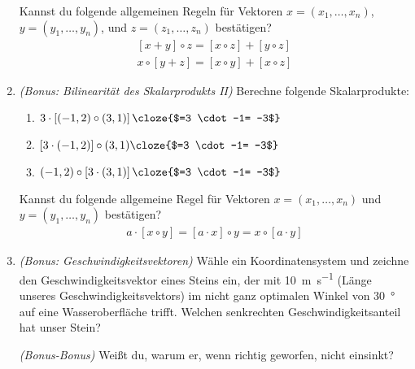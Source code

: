 \begin{enumerate}
  Kannst du folgende allgemeinen Regeln für Vektoren
  $x=(x_1,\dotsc,x_n)$, $y=(y_1,\dotsc,y_n)$, und $z=(z_1,\dotsc,z_n)$
  bestätigen?
  \begin{gather*}
    \left[x + y\right] \circ z
    = \left[x\circ z\right] + \left[y\circ z\right]
    \\
    x \circ \left[y + z\right]
    = \left[x\circ y\right] + \left[x\circ z\right]
  \end{gather*}
\item \emph{(Bonus: Bilinearität des Skalarprodukts II)}
  Berechne folgende Skalarprodukte:
  \begin{enumerate}
  \item $3 \cdot {}
    $
  \item $ \circ (3, 1)
    $
  \item $(-1, 2) \circ {}
    $
  \end{enumerate}
  Kannst du folgende allgemeine Regel für Vektoren
  $x=(x_1,\dotsc,x_n)$ und $y=(y_1,\dotsc,y_n)$ bestätigen?
  \begin{gather*}
    a \cdot \left[ x \circ y \right]
    = \left[ a\cdot x \right] \circ y
    = x \circ \left[ a\cdot y \right]
  \end{gather*}
\item \emph{(Bonus: Geschwindigkeitsvektoren)}
  Wähle ein Koordinatensystem und zeichne den Geschwindigkeitsvektor
  eines Steins ein, der mit \SI{10}{\meter\per\second} (Länge unseres
  Geschwindigkeitsvektors) im nicht ganz optimalen Winkel von
  \SI{30}{\degree} auf eine Wasseroberfläche trifft.
  Welchen senkrechten Geschwindigkeitsanteil hat unser Stein?
  \par
  \emph{(Bonus-Bonus)} Weißt du, warum er, wenn richtig geworfen, nicht einsinkt?

\end{enumerate}
